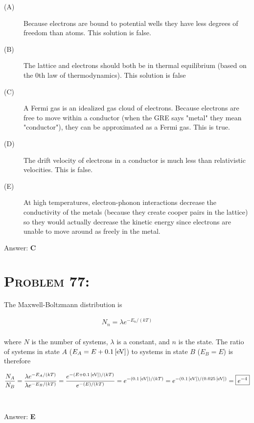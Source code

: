 \documentclass{article}
\begin{document}
\begin{description}

\item[(A)] Because electrons are bound to potential wells they have less degrees of freedom than atoms. This solution is false.

\item[(B)] The lattice and electrons should both be in thermal equilibrium (based on the $0$th law of thermodynamics). This solution is false

\item[(C)] A Fermi gas is an idealized gas cloud of electrons. Because electrons are free to move within a conductor (when the GRE says "metal" they mean "conductor"), they can be approximated as a Fermi gas. This is true.

\item[(D)] The drift velocity of electrons in a conductor is much less than relativistic velocities. This is false.

\item[(E)] At high temperatures, electron-phonon interactions decrease the conductivity of the metals (because they create cooper pairs in the lattice) so they would actually decrease the kinetic energy since electrons are unable to move around as freely in the metal.

\end{description}
Answer: \textbf{\textcolor{ProcessBlue}C}\\


\section{\textsc{Problem 77:}}The Maxwell-Boltzmann distribution is

\begin{gather}
N_{n} = \lambda e^{-E_{n}/(kT)}
\end{gather}
\\
where $N$ is the number of systems, $\lambda$ is a constant, and $n$ is the state. The ratio of systems in state $A$ ($E_{A} = E + \unit[0.1]{[eV]}$) to systems in state $B$ ($E_{B} = E$) is therefore

\begin{gather}
\frac{N_{A}}{N_{B}}  = \frac{\lambda e^{-E_{A}/(kT)}}{\lambda e^{-E_{B}/(kT)}} = \frac{e^{-(E + \unit[0.1]{[eV]})/(kT)}}{e^{-(E)/(kT)}} = e^{-(\unit[0.1]{[eV]})/ (kT)} = e^{-(\unit[0.1]{[eV]})/ (\unit[0.025]{[eV]})} = \boxed{e^{-4}}\nonumber
\end{gather}
\\\\
Answer: \textbf{\textcolor{ProcessBlue}E}\\
\end{document}
